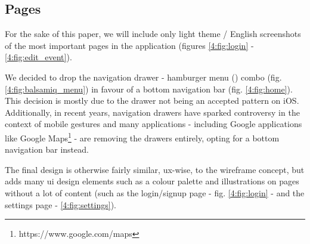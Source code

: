 \subsection{Pages} \label{4:pages}

For the sake of this paper, we will include only light theme / English screenshots of the most important pages in the application (figures \ref{4:fig:login} - \ref{4:fig:edit_event}).

We decided to drop the navigation drawer - hamburger menu (\faBars) combo (fig. \ref{4:fig:balsamiq_menu}) in favour of a bottom navigation bar (fig. \ref{4:fig:home}). This decision is mostly due to the drawer not being an accepted pattern on iOS. Additionally, in recent years, navigation drawers have sparked controversy\cite{verge2019controversy} in the context of mobile gestures and many applications - including Google applications like Google Maps\footnote{https://www.google.com/maps} - are removing the drawers entirely, opting for a bottom navigation bar instead.

The final design is otherwise fairly similar, \acrshort{ux}-wise, to the wireframe concept, but adds many \acrshort{ui} design elements such as a colour palette and illustrations on pages without a lot of content (such as the login/signup page - fig. \ref{4:fig:login} - and the settings page - \ref{4:fig:settings}).

